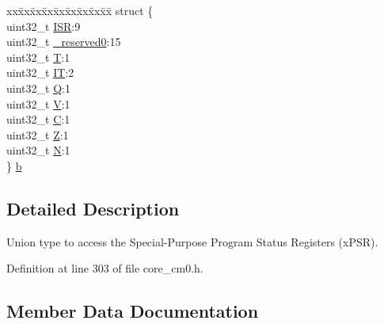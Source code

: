 \begin{DoxyCompactItemize}
\begin{tabbing}
\end{tabbing}\item 
\begin{tabbing}
xx\=xx\=xx\=xx\=xx\=xx\=xx\=xx\=xx\=\kill
struct \{\\
\>uint32\_t \hyperlink{unionx_p_s_r___type_a3e9120dcf1a829fc8d2302b4d0673970}{ISR}:9\\
\>uint32\_t \hyperlink{unionx_p_s_r___type_af438e0f407357e914a70b5bd4d6a97c5}{\_reserved0}:15\\
\>uint32\_t \hyperlink{unionx_p_s_r___type_a7eed9fe24ae8d354cd76ae1c1110a658}{T}:1\\
\>uint32\_t \hyperlink{unionx_p_s_r___type_a3200966922a194d84425e2807a7f1328}{IT}:2\\
\>uint32\_t \hyperlink{unionx_p_s_r___type_add7cbd2b0abd8954d62cd7831796ac7c}{Q}:1\\
\>uint32\_t \hyperlink{unionx_p_s_r___type_af14df16ea0690070c45b95f2116b7a0a}{V}:1\\
\>uint32\_t \hyperlink{unionx_p_s_r___type_a40213a6b5620410cac83b0d89564609d}{C}:1\\
\>uint32\_t \hyperlink{unionx_p_s_r___type_a1e5d9801013d5146f2e02d9b7b3da562}{Z}:1\\
\>uint32\_t \hyperlink{unionx_p_s_r___type_a2db9a52f6d42809627d1a7a607c5dbc5}{N}:1\\
\} \hyperlink{unionx_p_s_r___type_aadeab5e1061c379c66bd3e4c97c1c413}{b}\\

\end{tabbing}\end{DoxyCompactItemize}


\subsection{Detailed Description}
Union type to access the Special-\/\+Purpose Program Status Registers (x\+P\+SR). 

Definition at line 303 of file core\+\_\+cm0.\+h.



\subsection{Member Data Documentation}
\mbox{\label{unionx_p_s_r___type_af438e0f407357e914a70b5bd4d6a97c5}} 
